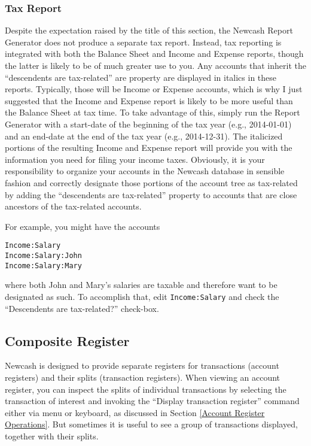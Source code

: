 \documentclass{report}
\begin{document}
\subsubsection{Tax Report}
Despite the expectation raised by the title of this section, the Newcash Report Generator does not produce a separate tax report. Instead, tax reporting is integrated with both the Balance Sheet and Income and Expense reports, though the latter is likely to be of 
much greater use to you. Any accounts that inherit the ``descendents are tax-related'' are property are displayed in italics in these reports. Typically, those will be Income or Expense accounts, which is why I just suggested that the Income and Expense report is likely to be more useful than the Balance Sheet at tax time. To take advantage of this, simply run the Report Generator with a start-date of the beginning of the tax year (e.g., 2014-01-01) and an end-date at the end of the tax year (e.g., 2014-12-31). The italicized portions of the resulting Income and Expense report will provide you with the information you need for filing your income taxes. Obviously, it is your responsibility to organize your accounts in the Newcash database in sensible fashion and correctly designate those portions of the account tree as tax-related by adding the ``descendents are tax-related'' property to accounts that are close ancestors of the tax-related accounts.

For example, you might have the accounts
\begin{verbatim}
Income:Salary
Income:Salary:John
Income:Salary:Mary
\end{verbatim}
where both John and Mary's salaries are taxable and therefore want to be designated as such. To accomplish that, edit \verb|Income:Salary| and check the ``Descendents are tax-related?'' check-box.

\subsection{Composite Register}
\label{Composite Register}
Newcash is designed to provide separate registers for transactions (account registers) and their splits (transaction registers). When viewing an account register, you can inspect the splits of individual transactions by selecting the transaction of interest and invoking the ``Display transaction register'' command either via menu or keyboard, as discussed in Section \ref{Account Register Operations}. But sometimes it is useful to see a group of transactions displayed, together with their splits. 
\end{document}
